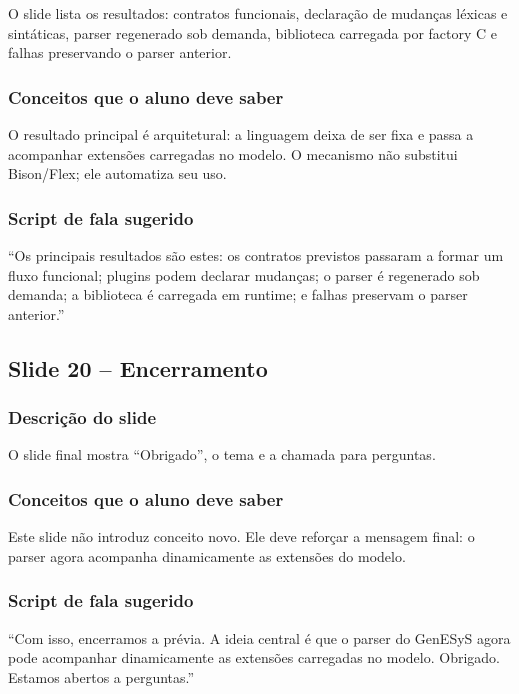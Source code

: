 \documentclass[12pt,a4paper]{article}
\newcommand{\slide}[2]{\subsection{Slide #1 -- #2}}
\begin{document}
O slide lista os resultados: contratos funcionais, declara\c{c}\~ao de mudan\c{c}as l\'exicas e sint\'aticas, parser regenerado sob demanda, biblioteca carregada por factory C e falhas preservando o parser anterior.

\subsubsection*{Conceitos que o aluno deve saber}

O resultado principal \'e arquitetural: a linguagem deixa de ser fixa e passa a acompanhar extens\~oes carregadas no modelo. O mecanismo n\~ao substitui Bison/Flex; ele automatiza seu uso.

\subsubsection*{Script de fala sugerido}

``Os principais resultados s\~ao estes: os contratos previstos passaram a formar um fluxo funcional; plugins podem declarar mudan\c{c}as; o parser \'e regenerado sob demanda; a biblioteca \'e carregada em runtime; e falhas preservam o parser anterior.''

\slide{20}{Encerramento}

\subsubsection*{Descri\c{c}\~ao do slide}

O slide final mostra ``Obrigado'', o tema e a chamada para perguntas.

\subsubsection*{Conceitos que o aluno deve saber}

Este slide n\~ao introduz conceito novo. Ele deve refor\c{c}ar a mensagem final: o parser agora acompanha dinamicamente as extens\~oes do modelo.

\subsubsection*{Script de fala sugerido}

``Com isso, encerramos a pr\'evia. A ideia central \'e que o parser do GenESyS agora pode acompanhar dinamicamente as extens\~oes carregadas no modelo. Obrigado. Estamos abertos a perguntas.''
\end{document}
